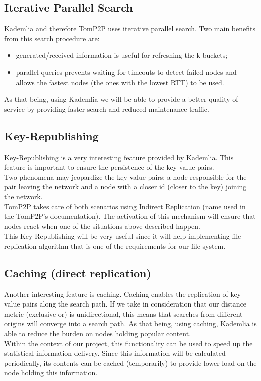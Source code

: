 \documentclass[times,9pt,article]{llncs}
\begin{document}
\subsection{Iterative Parallel Search}
Kademlia and therefore TomP2P uses iterative parallel search. Two main benefits
from this search procedure are: 
\begin{itemize}
\item generated/received information is useful for refreshing the k-buckets;
\item parallel queries prevents waiting for timeouts to detect failed nodes and 
allows the fastest nodes (the ones with the lowest RTT) to be used. 
\end{itemize} 
As that being, using Kademlia we will be able to provide a better quality of
service by providing faster search and reduced maintenance traffic.

\subsection{Key-Republishing}
Key-Republishing is a very interesting feature provided by Kademlia. This feature
is important to ensure the persistence of the key-value pairs.\\
Two phenomena may jeopardize the key-value pairs: a node responsible for the pair
leaving the network and a node with a closer id (closer to the key) joining the
network. \\
TomP2P takes care of both scenarios using Indirect Replication (name used in the
TomP2P's documentation). The activation of this mechanism will ensure that nodes
react when one of the situations above described happen. \\
This Key-Republishing will be very useful since it will help implementing file
replication algorithm that is one of the requirements for our file system.   

\subsection{Caching (direct replication)}

Another interesting feature is caching. Caching enables the replication of 
key-value pairs along the search path. If we take in consideration that our 
distance metric (exclusive or) is unidirectional, this means that searches 
from different origins will converge into a search path. As that being, using
caching, Kademlia is able to reduce the burden on nodes holding popular content.\\
Within the context of our project, this functionality can be used to speed up
the statistical information delivery. Since this information will be calculated
periodically, its contents can be cached (temporarily) to provide lower load on
the node holding this information.
\end{document}
